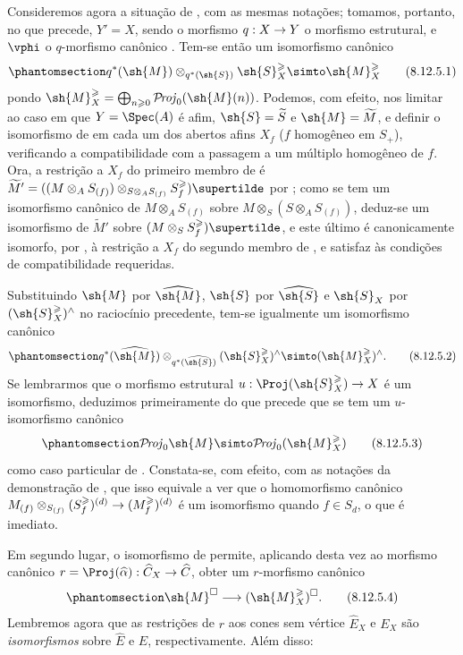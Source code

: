\documentclass[oneside,10pt]{amsart}
\makeatletter
\renewcommand{\geq}{\geqslant}
\newcommand{\ega@arrow}[2]{\mathchoice{#1}{#2}{#2}{#2}}
\renewcommand{\to}{\ega@arrow{\longrightarrow}{\rightarrow}}
\def\shProj{\mathcal{P}\!\mathit{roj}}
\newcommand{\oldpage}[2][]{\marginnote{\normalfont\footnotesize\textbf{#1}~|~#2}\ignorespaces}
\let\EGAOriginalLabel\label
\renewcommand{\label}[1]{\phantomsection\EGAOriginalLabel{#1}}
\makeatother
\begin{document}
\begin{env}[8.12.5]
\label{II.8.12.5}
Consideremos agora a situação de , com as mesmas notações;
tomamos, portanto, no que precede, $Y'=X$, sendo o morfismo $q:X\to Y$ o morfismo estrutural, e $\vphi$ o $q$-morfismo canônico .
Tem-se então um isomorfismo canônico
\[
\label{II.8.12.5.1}
  q^*(\sh{M})\otimes_{q^*(\sh{S})}\sh{S}_X^\geq\simto\sh{M}_X^\geq
\tag{8.12.5.1}
\]
pondo $\sh{M}_X^\geq=\bigoplus_{n\geq0}\shProj_0(\sh{M}(n))$.
Podemos, com efeito, nos limitar ao caso em que $Y=\Spec(A)$ é afim, $\sh{S}=\widetilde{S}$ e $\sh{M}=\widetilde{M}$, e definir o isomorfismo de  em cada um dos abertos afins $X_f$ ($f$ homogêneo em $S_+$), verificando a compatibilidade com a passagem a um múltiplo homogêneo de $f$.
Ora, a restrição a $X_f$ do primeiro membro de  é $\widetilde{M}'=((M\otimes_A S_{(f)})\otimes_{S\otimes_A S_{(f)}}S_f^\geq)\supertilde$ por ;
como se tem um isomorfismo canônico de $M\otimes_A S_{(f)}$ sobre $M\otimes_S(S\otimes_A S_{(f)})$, deduz-se um isomorfismo de $\widetilde{M}'$ sobre $(M\otimes_S S_f^\geq)\supertilde$, e este último é canonicamente isomorfo, por , à restrição a $X_f$ do segundo membro de , e satisfaz às condições de compatibilidade requeridas.
\oldpage[II]{194}

Substituindo $\sh{M}$ por $\widehat{\sh{M}}$, $\sh{S}$ por $\widehat{\sh{S}}$ e $\sh{S}_X$ por $(\sh{S}_X^\geq)^\wedge$ no raciocínio precedente, tem-se igualmente um isomorfismo canônico
\[
\label{II.8.12.5.2}
  q^*(\widehat{\sh{M}})\otimes_{q^*(\widehat{\sh{S}})}(\sh{S}_X^\geq)^\wedge\simto(\sh{M}_X^\geq)^\wedge.
\tag{8.12.5.2}
\]
Se lembrarmos  que o morfismo estrutural $u:\Proj(\sh{S}_X^\geq)\to X$ é um isomorfismo, deduzimos primeiramente do que precede que se tem um $u$-isomorfismo canônico
\[
\label{II.8.12.5.3}
  \shProj_0\sh{M}\simto\shProj_0(\sh{M}_X^\geq)
\tag{8.12.5.3}
\]
como caso particular de .
Constata-se, com efeito, com as notações da demonstração de , que isso equivale a ver que o homomorfismo canônico $M_{(f)}\otimes_{S_{(f)}}(S_f^\geq)^{(d)}\to(M_f^\geq)^{(d)}$ é um isomorfismo quando $f\in S_d$, o que é imediato.

Em segundo lugar, o isomorfismo de  permite, aplicando desta vez  ao morfismo canônico $r=\Proj(\widehat{\alpha}):\widehat{C}_X\to\widehat{C}$, obter um $r$-morfismo canônico
\[
\label{II.8.12.5.4}
  \sh{M}^\square\to(\sh{M}_X^\geq)^\square.
\tag{8.12.5.4}
\]
Lembremos agora  que as restrições de $r$ aos cones sem vértice $\widehat{E}_X$ e $E_X$ são \emph{isomorfismos} sobre $\widehat{E}$ e $E$, respectivamente.
Além disso:
\end{env}
\end{document}
